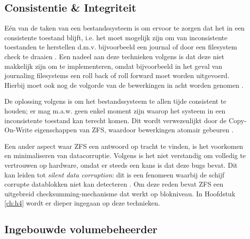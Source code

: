 \subsection{Consistentie \& Integriteit}

Eén van de taken van een bestandssysteem is om ervoor te zorgen dat het in een consistente toestand blijft, i.e. het moet mogelijk zijn om van inconsistente toestanden te herstellen d.m.v. bijvoorbeeld een journal of door een filesystem check te draaien \autocite{OSThreePiecesRemzi2015}. Een nadeel aan deze technieken volgens \textcite{ZFSBonwick} is dat deze niet makkelijk zijn om te implementeren, omdat bijvoorbeeld in het geval van journaling filesystems een roll back of roll forward moet worden uitgevoerd. Hierbij moet ook nog de volgorde van de bewerkingen in acht worden genomen \autocite{OSThreePiecesRemzi2015}. 

De oplossing volgens \textcite{ZFSBonwick} is om het bestandssysteem te allen tijde consistent te houden; er mag m.a.w. geen enkel moment zijn waarop het systeem in een inconsistente toestand kan terecht komen. Dit wordt verwezenlijkt door de Copy-On-Write eigenschappen van ZFS, waardoor bewerkingen atomair gebeuren \autocite{Li2009}. 

Een ander aspect waar ZFS een antwoord op tracht te vinden, is het voorkomen en minimaliseren van datacorruptie. Volgens \textcite{ZFSBonwick} is het niet verstandig om volledig te vertrouwen op hardware, omdat er steeds een kans is dat deze bugs bevat. Dit kan leiden tot \textit{silent data corruption}: dit is een fenomeen waarbij de schijf corrupte datablokken niet kan detecteren \autocite{OSThreePiecesRemzi2015}. Om deze reden bevat ZFS een uitgebreid checksumming-mechanisme dat werkt op blokniveau.
In Hoofdstuk \ref{ch:h4} wordt er dieper ingegaan op deze technieken.

\subsection{Ingebouwde volumebeheerder}

